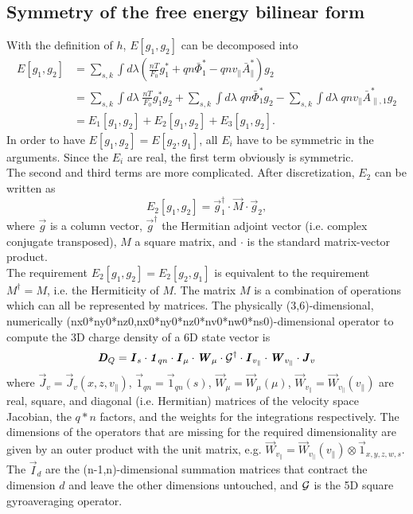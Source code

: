 \documentclass[12pt]{article}
\begin{document}
\subsection{Symmetry of the free energy bilinear form}
With the definition of $h$, $E[g_1,g_2]$ can be decomposed into
\begin{align}
E[g_1,g_2]&=\sum_{s,k}\int d\lambda (\frac{nT}{F_0} g_1^*+qn\bar \Phi_1^*-qnv_\parallel\bar A_\parallel^*) g_2\nonumber\\
&=\sum_{s,k}\int d\lambda \;\frac{nT}{F_0}g_1^* g_2+\sum_{s,k}\int d\lambda\; qn \bar \Phi_1^* g_2
-\sum_{s,k}\int d\lambda\; qn v_\parallel\bar A_{\parallel,1}^* g_2\nonumber\\
&=E_1[g_1,g_2]+E_2[g_1,g_2]+E_3[g_1,g_2].
\end{align}
In order to have $E[g_1,g_2]=E[g_2,g_1]$, all $E_i$ have to be symmetric in the arguments.
Since the $E_i$ are real, the first term obviously is symmetric.\\
The second and third terms are more complicated. After discretization, $E_2$ can be written as
$$E_2[g_1,g_2]=\vec g_1^\dag\cdot\vec M\cdot \vec g_2,$$ 
where $\vec g$ is a column vector, $\vec g ^\dag$ the Hermitian adjoint vector 
(i.e. complex conjugate transposed), $M$ a square matrix, and $\cdot$ is the standard 
matrix-vector product.\\
The requirement $E_2[g_1,g_2]=E_2[g_2,g_1]$ is equivalent to the requirement $M^\dag=M$, 
i.e. the Hermiticity of $M$. The matrix $M$ is a combination of operations which can all be
represented by matrices.
The physically (3,6)-dimensional, numerically (nx0*ny0*nz0,nx0*ny0*nz0*nv0*nw0*ns0)-dimensional 
operator to compute the 3D charge density of a 6D state vector is
$$\textbf{\textit{D}}_Q=\textbf{\textit{I}}_s \cdot\textbf{\textit{1}}_{qn}\cdot \textbf{\textit{I}}_\mu \cdot \textbf{\textit{W}}_\mu \cdot\mathcal{G}^\dag\cdot \textbf{\textit{I}}_{v_\parallel}\cdot \textbf{\textit{W}}_{v_\parallel} \cdot \textbf{\textit{J}}_v$$
where $\vec J_v=\vec J_v(x,z,v_\parallel)$, $\vec 1_{qn}=\vec 1_{qn}(s)$, $\vec W_\mu=\vec W_\mu(\mu)$, 
$\vec W_{v_\parallel}=\vec W_{v_\parallel}(v_\parallel)$ are real, square, and diagonal 
(i.e. Hermitian) matrices of the velocity space Jacobian, the $q*n$ factors, and the weights 
for the integrations respectively. 
The dimensions of the operators that are missing for the required dimensionality are given by an outer 
product with the unit matrix, e.g. 
$\vec W_{v_\parallel}=\vec W_{v_\parallel}(v_\parallel)\otimes \vec 1_{x,y,z,w,s}$. The
$\vec I_d$ are the (n-1,n)-dimensional summation matrices that contract the dimension $d$ and leave the 
other dimensions untouched, and $\mathcal{G}$ is the 5D square gyroaveraging operator.\\
\end{document}
